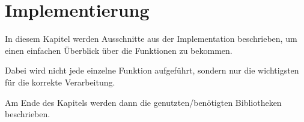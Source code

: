 \chapter{Implementierung}
\writtenby{\dcauthornameriren}%
In diesem Kapitel werden Ausschnitte aus der Implementation beschrieben, um einen einfachen Überblick über die Funktionen zu bekommen.

Dabei wird nicht jede einzelne Funktion aufgeführt, sondern nur die wichtigsten für die korrekte Verarbeitung.

Am Ende des Kapitels werden dann die genutzten/benötigten Bibliotheken beschrieben.












